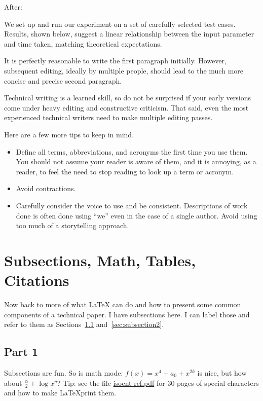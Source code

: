 \documentclass[12pt]{article}
\begin{document}
After:

We set up and run our experiment on a set of carefully selected test
cases.  Results, shown below, suggest a linear relationship between
the input parameter and time taken, matching theoretical expectations.

It is perfectly reasonable to write the first paragraph initially.
However, subsequent editing, ideally by multiple people, should lead
to the much more concise and precise second paragraph.

Technical writing is a learned skill, so do not be surprised if your
early versions come under heavy editing and constructive criticism.
That said, even the most experienced technical writers need to make
multiple editing passes.

Here are a few more tips to keep in mind.

\begin{itemize}
[I
\item Define all terms, abbreviations, and acronyms the first time you
  use them.  You should not assume your reader is aware of them, and
  it is annoying, as a reader, to feel the need to stop reading to
  look up a term or acronym.

\item Avoid contractions.

\item Carefully consider the voice to use and be consistent.
  Descriptions of work done is often done using ``we'' even in the
  case of a single author.  Avoid using too much of a storytelling
  approach.

\end{itemize}


\section{Subsections, Math, Tables, Citations}
\label{sec:subsections}

Now back to more of what \LaTeX{} can do and how to present some
common components of a technical paper.  I have subsections here.  I
can label those and refer to them as Sections~\ref{sec:subsection1}
and~\ref{sec:subsection2}.

\subsection{Part 1}
\label{sec:subsection1}

Subsections are fun.  So is math mode: $f(x) = x^4 + a_0 + x^{2k}$ is
nice, but how about $\frac{\alpha}{2} + \log x^y$?  Tip: see the file
\url{isoent-ref.pdf} for 30 pages
of special characters and how to make \LaTeX print them.
\end{document}
